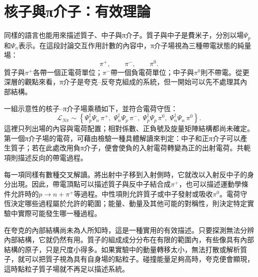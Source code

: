 \begin{classroomqa}
\end{classroomqa}

\section{核子與{\proseunicodefont π}介子：有效理論}

同樣的語言也能用來描述質子、中子與{\proseunicodefont π}介子。質子與中子是費米子，分別以場\(\Psi_p\)和\(\Psi_n\)表示。在這段討論交互作用計數的內容中，{\proseunicodefont π}介子場視為三種帶電狀態的純量場：
\begin{equation}
\pi^+,
\qquad
\pi^-,
\qquad
\pi^0.
\end{equation}
質子與\(\pi^+\)各帶一個正電荷單位；\(\pi^-\)帶一個負電荷單位；中子與\(\pi^0\)則不帶電。從更深層的觀點來看，{\proseunicodefont π}介子是夸克--反夸克組成的系統，但一開始可以先不處理其內部結構。

一組示意性的核子--{\proseunicodefont π}介子場乘積如下，並符合電荷守恆：
\begin{equation}
\mathcal L_{N\pi}
\sim
\left\{
\Psi_p^\dagger\Psi_n\,\pi^+,\;
\Psi_n^\dagger\Psi_p\,\pi^-,\;
\Psi_p^\dagger\Psi_p\,\pi^0,\;
\Psi_n^\dagger\Psi_n\,\pi^0
\right\}.
\end{equation}
這裡只列出場的內容與電荷配置；相對係數、正負號及旋量矩陣結構都尚未確定。第一個{\proseunicodefont π}介子場的電荷，可藉由檢驗一種具體解讀來判定：中子和正{\proseunicodefont π}介子可以產生質子；若在此處改用負{\proseunicodefont π}介子，便會使負的入射電荷轉變為正的出射電荷。共軛項則描述反向的帶電過程。

每一項同樣有數種交叉解讀。將出射中子移到入射側時，它就改以入射反中子的身分出現。因此，帶電頂點可以描述質子與反中子結合成\(\pi^+\)，也可以描述運動學條件允許時的\(p\to n+\pi^+\)等過程。中性項則允許質子或中子發射或吸收\(\pi^0\)。電荷守恆決定哪些過程屬於允許的範圍；能量、動量及其他可能的對稱性，則決定特定實驗中實際可能發生哪一種過程。

在夸克的內部結構尚未為人所知時，這是一種實用的有效描述。只要探測無法分辨內部結構，它就仍然有用。質子的組成成分分布在有限的範圍內，有些像具有內部結構的原子，只是尺度小得多。如果實驗中的動量轉移太小，無法打散或解析質子，就可以把質子視為具有自身場的點粒子。碰撞能量足夠高時，夸克便會顯現，這時點粒子質子場就不再足以描述系統。

